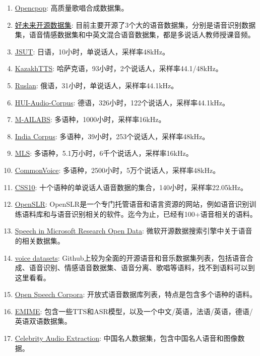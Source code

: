 \documentclass[cn,10pt,math=newtx,citestyle=gb7714-2015,bibstyle=gb7714-2015]{elegantbook}
\begin{document}
\begin{enumerate}
  \item \href{https://wenet.org.cn/opencpop}{Opencpop}: 高质量歌唱合成数据集。
  \item \href{https://ai.100tal.com/dataset}{好未来开源数据集}: 目前主要开源了3个大的语音数据集，分别是语音识别数据集，语音情感数据集和中英文混合语音数据集，都是多说话人教师授课音频。
  \item \href{https://sites.google.com/site/shinnosuketakamichi/publication/jsut}{JSUT}: 日语，10小时，单说话人，采样率48kHz。
  \item \href{https://github.com/IS2AI/Kazakh_TTS}{KazakhTTS}: 哈萨克语，93小时，2个说话人，采样率44.1/48kHz。
  \item \href{https://ruslan-corpus.github.io/}{Ruslan}: 俄语，31小时，单说话人，采样率44.1kHz。
  \item \href{https://github.com/iisys-hof/HUI-Audio-Corpus-German}{HUI-Audio-Corpus}: 德语，326小时，122个说话人，采样率44.1kHz。
  \item \href{https://github.com/imdatsolak/m-ailabs-dataset}{M-AILABS}: 多语种，1000小时，采样率16kHz。
  \item \href{https://data.statmt.org/pmindia/}{India Corpus}: 多语种，39小时，253个说话人，采样率48kHz。
  \item \href{http://www.openslr.org/94/}{MLS}: 多语种，5.1万小时，6千个说话人，采样率16kHz。
  \item \href{https://commonvoice.mozilla.org/zh-CN/datasets}{CommonVoice}: 多语种，2500小时，5万个说话人，采样率48kHz。
  \item \href{https://github.com/Kyubyong/css10}{CSS10}: 十个语种的单说话人语音数据的集合，140小时，采样率22.05kHz。
  \item \href{https://www.openslr.org/resources.php}{OpenSLR}: OpenSLR是一个专门托管语音和语言资源的网站，例如语音识别训练语料库和与语音识别相关的软件。迄今为止，已经有100+语音相关的语料。
  \item \href{https://msropendata.com/datasets?term=speech}{Speech in Microsoft Research Open Data}: 微软开源数据搜索引擎中关于语音的相关数据集。
  \item \href{https://github.com/jim-schwoebel/voice_datasets}{voice datasets}: Github上较为全面的开源语音和音乐数据集列表，包括语音合成、语音识别、情感语音数据集、语音分离、歌唱等语料，找不到语料可以到这里看看。
  \item \href{https://github.com/JRMeyer/open-speech-corpora}{Open Speech Corpora}: 开放式语音数据库列表，特点是包含多个语种的语料。
  \item \href{https://www.emime.org/participate.html}{EMIME}: 包含一些TTS和ASR模型，以及一个中文/英语，法语/英语，德语/英语双语数据集。
  \item \href{https://github.com/celebrity-audio-collection/videoprocess}{Celebrity Audio Extraction}: 中国名人数据集，包含中国名人语音和图像数据。
\end{enumerate}
\end{document}
